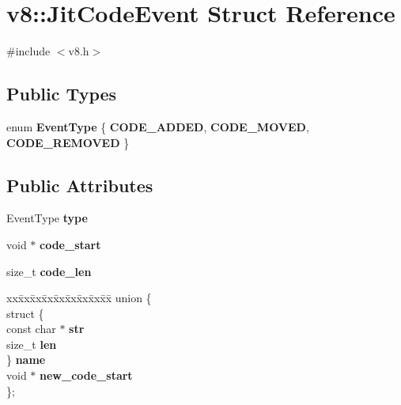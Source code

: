 \hypertarget{structv8_1_1_jit_code_event}{}\section{v8\+:\+:Jit\+Code\+Event Struct Reference}
\label{structv8_1_1_jit_code_event}


{\ttfamily \#include $<$v8.\+h$>$}

\subsection*{Public Types}
\begin{DoxyCompactItemize}
\item 
\hypertarget{structv8_1_1_jit_code_event_ac4f8e391762567a2710eb5552b5f11f7}{}enum {\bfseries Event\+Type} \{ {\bfseries C\+O\+D\+E\+\_\+\+A\+D\+D\+E\+D}, 
{\bfseries C\+O\+D\+E\+\_\+\+M\+O\+V\+E\+D}, 
{\bfseries C\+O\+D\+E\+\_\+\+R\+E\+M\+O\+V\+E\+D}
 \}\label{structv8_1_1_jit_code_event_ac4f8e391762567a2710eb5552b5f11f7}

\end{DoxyCompactItemize}
\subsection*{Public Attributes}
\begin{DoxyCompactItemize}
\item 
\hypertarget{structv8_1_1_jit_code_event_ace1fbc4119ac3ef609d8e0f89cbc2c9f}{}Event\+Type {\bfseries type}\label{structv8_1_1_jit_code_event_ace1fbc4119ac3ef609d8e0f89cbc2c9f}

\item 
\hypertarget{structv8_1_1_jit_code_event_aeeac614e6c125bf08bf785b070090d0f}{}void $\ast$ {\bfseries code\+\_\+start}\label{structv8_1_1_jit_code_event_aeeac614e6c125bf08bf785b070090d0f}

\item 
\hypertarget{structv8_1_1_jit_code_event_ad56f78749d03f5db29ed417c2f3b4666}{}size\+\_\+t {\bfseries code\+\_\+len}\label{structv8_1_1_jit_code_event_ad56f78749d03f5db29ed417c2f3b4666}

\item 
\hypertarget{structv8_1_1_jit_code_event_af7964de4fa0dd0e4cf77749493ab606c}{}\begin{tabbing}
xx\=xx\=xx\=xx\=xx\=xx\=xx\=xx\=xx\=\kill
union \{\\
\>struct \{\\
\>\>const char $\ast$ {\bfseries str}\\
\>\>size\_t {\bfseries len}\\
\>\} {\bfseries name}\\
\>void $\ast$ {\bfseries new\_code\_start}\\
\}; \label{structv8_1_1_jit_code_event_af7964de4fa0dd0e4cf77749493ab606c}
\\

\end{tabbing}\end{DoxyCompactItemize}


